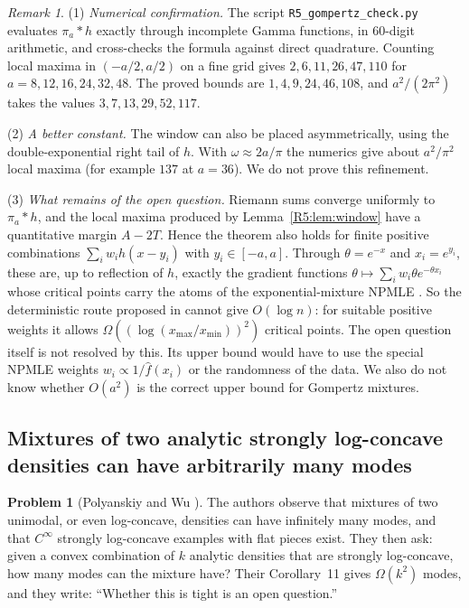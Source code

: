 \documentclass[11pt]{amsart}
\theoremstyle{definition}
\newtheorem{problem}[theorem]{Problem}
\theoremstyle{remark}
\newtheorem{remark}[theorem]{Remark}
\begin{document}
\begin{remark}\label{R5:rem:gompertz}
(1) \emph{Numerical confirmation.}  The script
\texttt{R5\_\allowbreak{}gompertz\_\allowbreak{}check.py} evaluates $\pi_a*h$ exactly through
incomplete Gamma functions, in $60$-digit arithmetic, and cross-checks the
formula against direct quadrature.  Counting local maxima in $(-a/2,a/2)$ on a fine grid
gives $2,6,11,26,47,110$ for $a=8,12,16,24,32,48$.  The proved bounds are
$1,4,9,24,46,108$, and $a^2/(2\pi^2)$ takes the values $3,7,13,29,52,117$.

(2) \emph{A better constant.}  The window can also be placed
asymmetrically, using the double-exponential right tail of $h$.  With
$\omega\approx 2a/\pi$ the numerics give about $a^2/\pi^2$ local maxima
(for example $137$ at $a=36$).  We do not prove this refinement.

(3) \emph{What remains of the open question.}  Riemann sums converge
uniformly to $\pi_a*h$, and the local maxima produced by
Lemma~\ref{R5:lem:window} have a quantitative margin $A-2T$.  Hence the
theorem also holds for finite positive combinations $\sum_iw_ih(x-y_i)$ with
$y_i\in[-a,a]$.  Through $\theta=e^{-x}$ and $x_i=e^{y_i}$, these are, up to
reflection of $h$, exactly the gradient functions
$\theta\mapsto\sum_iw_i\theta e^{-\theta x_i}$ whose critical points carry
the atoms of the exponential-mixture NPMLE \cite[eq.~(35)]{R5-PW20}.  So
the deterministic route proposed in \cite{R5-PW20} cannot give
$O(\log n)$: for suitable positive weights it allows
$\Omega((\log(x_{\max}/x_{\min}))^2)$ critical points.  The open question
itself is not resolved by this.  Its upper bound would have to use the
special NPMLE weights $w_i\propto1/\widehat f(x_i)$ or the randomness of the
data.  We also do not know whether $O(a^2)$ is the correct upper bound for
Gompertz mixtures.
\end{remark}

\subsection{Mixtures of two analytic strongly log-concave densities can have arbitrarily many modes}
\label{R5:sec:modes}

\begin{problem}[Polyanskiy and Wu {\cite[Sec.~5.5]{R5-PW20}}]
\label{R5:prob:modes}
The authors observe that mixtures of two unimodal, or even log-concave,
densities can have infinitely many modes, and that $C^\infty$ strongly
log-concave examples with flat pieces exist.  They then ask: given a convex
combination of $k$ analytic densities that are strongly log-concave, how
many modes can the mixture have?  Their Corollary~11 gives $\Omega(k^2)$
modes, and they write: ``Whether this is tight is an open question.''
\end{problem}
\end{document}

